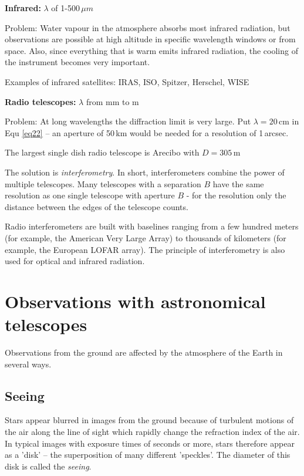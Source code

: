 \textbf{Infrared:} $\lambda$ of 1-500\,$\mu m$

Problem: Water vapour in the atmosphere absorbs most infrared radiation, but observations are possible at high altitude in specific wavelength windows or from space. Also, since everything that is warm emits infrared radiation, the cooling of the instrument becomes very important. 

Examples of infrared satellites: IRAS, ISO, Spitzer, Herschel, WISE

\textbf{Radio telescopes:} $\lambda$ from mm to m

Problem: At long wavelengths the diffraction limit is very large. Put $\lambda = 20$\,cm in Equ \eqref{eq22} -- an aperture of 50\,km would be needed for a resolution of 1\,arcsec.

The largest single dish radio telescope is Arecibo with $D = 305$\,m

The solution is \textit{interferometry}. In short, interferometers combine the power of multiple telescopes. Many telescopes with a separation $B$ have the same resolution as one single telescope with aperture $B$ - for the resolution only the distance between the edges of the telescope counts.

Radio interferometers are built with baselines ranging from a few hundred meters (for example, the American Very Large Array) to thousands of kilometers (for example, the European LOFAR array). The principle of interferometry is also used for optical and infrared radiation.

\section{Observations with astronomical telescopes}

Observations from the ground are affected by the atmosphere of the Earth in several ways.

\subsection{Seeing}

Stars appear blurred in images from the ground because of turbulent motions of the air along the line of sight which rapidly change the refraction index of the air. In typical images with exposure times of seconds or more, stars therefore appear as a 'disk' -- the superposition of many different 'speckles'. The diameter of this disk is called the \textit{seeing}. 

